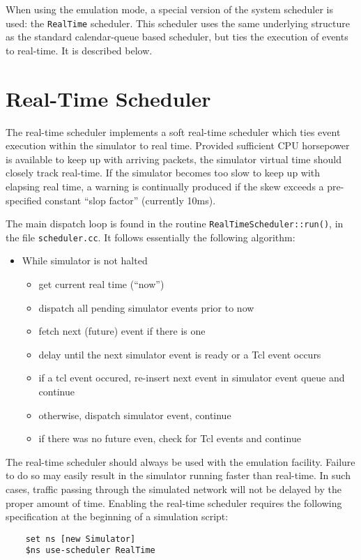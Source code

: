 When using the emulation mode, a special version of the system
scheduler is used: the {\tt RealTime} scheduler.
This scheduler uses the same underlying structure as the
standard calendar-queue based scheduler, but ties the execution of
events to real-time.
It is described below.

\section{Real-Time Scheduler}

The real-time scheduler implements a soft real-time scheduler
which ties event execution within the simulator to real time.
Provided sufficient CPU horsepower is available to keep up
with arriving packets, the simulator virtual time should closely
track real-time.
If the simulator becomes too slow to keep up with elapsing real
time, a warning is continually produced if the skew exceeds a
pre-specified constant ``slop factor'' (currently 10ms).

The main dispatch loop is found in the routine {\tt RealTimeScheduler::run()},
in the file {\tt scheduler.cc}.
It follows essentially the following algorithm:
\begin{itemize}
	\item While simulator is not halted
	\begin{itemize}
		\item get current real time (``now'')
		\item dispatch all pending simulator events prior to now
		\item fetch next (future) event if there is one
		\item delay until the next simulator event is ready or a Tcl event occurs
		\item if a tcl event occured, re-insert next event in simulator event queue and continue
		\item otherwise, dispatch simulator event, continue
		\item if there was no future even, check for Tcl events and continue
	\end{itemize}
\end{itemize}

The real-time scheduler should always be used with the emulation facility.
Failure to do so may easily result in the simulator running faster
than real-time.
In such cases, traffic passing through the simulated network will
not be delayed by the proper amount of time.
Enabling the real-time scheduler requires the
following specification at the beginning of a simulation script:
\begin{verbatim}
    set ns [new Simulator]
    $ns use-scheduler RealTime
\end{verbatim}

